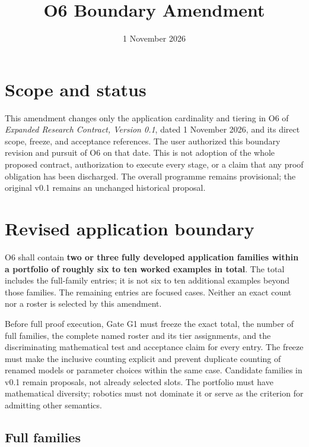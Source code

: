 \documentclass[11pt,a4paper]{article}
\title{O6 Boundary Amendment}
\author{}
\date{1 November 2026}
\begin{document}
\maketitle
\vspace{-1.5em}

\section{Scope and status}

This amendment changes only the application cardinality and tiering in O6 of
\emph{Expanded Research Contract, Version 0.1}, dated 1 November 2026, and
its direct scope, freeze, and acceptance references. The user authorized this
boundary revision and pursuit of O6 on that date. This is not adoption of the
whole proposed contract, authorization to execute every stage, or a claim that
any proof obligation has been discharged. The overall programme remains
provisional; the original v0.1 remains an unchanged historical proposal.

\section{Revised application boundary}

O6 shall contain \textbf{two or three fully developed application families
within a portfolio of roughly six to ten worked examples in total}.
The total includes the full-family entries; it is not six to ten additional
examples beyond those families. The remaining entries are focused cases.
Neither an exact count nor a roster is selected by this amendment.

Before full proof execution, Gate G1 must freeze the exact total, the number
of full families, the complete named roster and its tier assignments, and
the discriminating mathematical test and acceptance claim for every entry.
The freeze must make the inclusive counting explicit and prevent duplicate
counting of renamed models or parameter choices within the same case.
Candidate families in v0.1 remain proposals, not already selected slots.
The portfolio must have mathematical diversity; robotics must not dominate
it or serve as the criterion for admitting other semantics.

\subsection{Full families}
\end{document}
